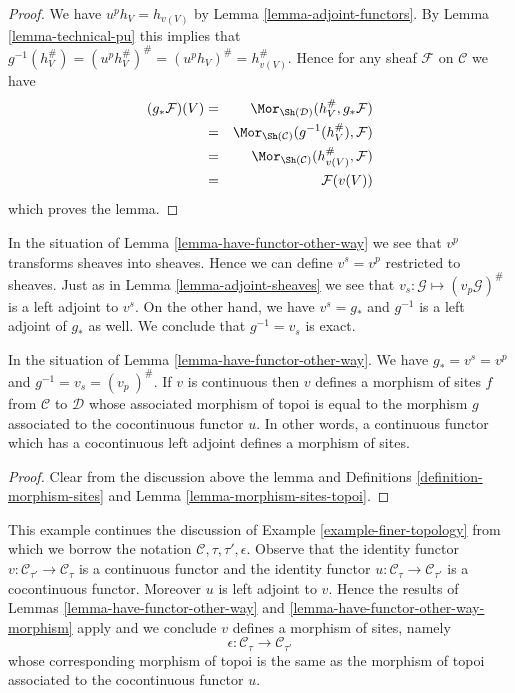 \begin{proof}
We have $u^ph_V = h_{v(V)}$ by Lemma \ref{lemma-adjoint-functors}.
By Lemma \ref{lemma-technical-pu} this implies that
$g^{-1}(h_V^\#) = (u^ph_V^\#)^\# = (u^ph_V)^\# = h_{v(V)}^\#$.
Hence for any sheaf $\mathcal{F}$ on $\mathcal{C}$ we have
\begin{eqnarray*}
(g_*\mathcal{F})(V)
& = &
\Mor_{\Sh(\mathcal{D})}(h_V^\#, g_*\mathcal{F}) \\
& = &
\Mor_{\Sh(\mathcal{C})}(g^{-1}(h_V^\#), \mathcal{F}) \\
& = &
\Mor_{\Sh(\mathcal{C})}(h_{v(V)}^\#, \mathcal{F}) \\
& = &
\mathcal{F}(v(V))
\end{eqnarray*}
which proves the lemma.
\end{proof}

\noindent
In the situation of Lemma \ref{lemma-have-functor-other-way}
we see that $v^p$ transforms sheaves
into sheaves. Hence we can define $v^s = v^p$ restricted to sheaves.
Just as in Lemma \ref{lemma-adjoint-sheaves} we see that
$v_s : \mathcal{G} \mapsto (v_p\mathcal{G})^\#$ is a left adjoint to $v^s$.
On the other hand, we have $v^s = g_*$ and $g^{-1}$ is a left
adjoint of $g_*$ as well. We conclude that $g^{-1} = v_s$ is exact.

\begin{lemma}
\label{lemma-have-functor-other-way-morphism}
In the situation of Lemma \ref{lemma-have-functor-other-way}.
We have $g_* = v^s = v^p$ and $g^{-1} = v_s = (v_p\ )^\#$.
If $v$ is continuous then $v$ defines a morphism of sites $f$
from $\mathcal{C}$ to $\mathcal{D}$ whose associated morphism
of topoi is equal to the morphism $g$ associated to the cocontinuous
functor $u$. In other words, a continuous functor which has a
cocontinuous left adjoint defines a morphism of sites.
\end{lemma}

\begin{proof}
Clear from the discussion above the lemma and
Definitions \ref{definition-morphism-sites} and
Lemma \ref{lemma-morphism-sites-topoi}.
\end{proof}

\begin{example}
\label{example-finer-topology-bis}
This example continues the discussion of
Example \ref{example-finer-topology}
from which we borrow the notation $\mathcal{C}, \tau, \tau', \epsilon$.
Observe that the identity functor $v : \mathcal{C}_{\tau'} \to \mathcal{C}_\tau$
is a continuous functor and the identity functor
$u : \mathcal{C}_\tau \to \mathcal{C}_{\tau'}$
is a cocontinuous functor. Moreover $u$ is left adjoint to $v$.
Hence the results of
Lemmas \ref{lemma-have-functor-other-way} and
\ref{lemma-have-functor-other-way-morphism}
apply and we conclude $v$ defines a morphism of sites, namely
$$
\epsilon : \mathcal{C}_\tau \longrightarrow \mathcal{C}_{\tau'}
$$
whose corresponding morphism of topoi is the same as the morphism
of topoi associated to the cocontinuous functor $u$.
\end{example}








